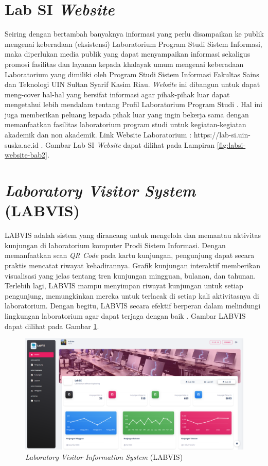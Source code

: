 \section{Lab SI \textit{Website}}
Seiring dengan bertambah banyaknya informasi yang perlu disampaikan ke publik mengenai keberadaan (eksistensi) Laboratorium Program Studi Sistem Informasi, maka diperlukan media publik yang dapat menyampaikan informasi sekaligus promosi fasilitas dan layanan kepada khalayak umum mengenai keberadaan Laboratorium yang dimiliki oleh Program Studi Sistem Informasi Fakultas Sains dan Teknologi UIN Sultan Syarif Kasim Riau. \textit{Website} ini dibangun untuk dapat meng-cover hal-hal yang bersifat informasi agar pihak-pihak luar dapat mengetahui lebih mendalam tentang Profil Laboratorium Program Studi \cite{kusuma2024penerapan}. Hal ini juga memberikan peluang kepada pihak luar yang ingin bekerja sama dengan memanfaatkan fasilitas laboratorium program studi untuk kegiatan-kegiatan akademik dan non akademik.  Link Website Laboratorium : https://lab-si.uin-suska.ac.id \cite{web-prodi}. Gambar Lab SI \textit{Website} dapat dilihat pada Lampiran \ref{fig:labsi-website-bab2}.

\section{\textit{Laboratory Visitor System} (LABVIS)}
LABVIS adalah sistem yang dirancang untuk mengelola dan memantau aktivitas kunjungan di laboratorium komputer Prodi Sistem Informasi. Dengan memanfaatkan scan \textit{QR Code} pada kartu kunjungan, pengunjung dapat secara praktis mencatat riwayat kehadirannya. Grafik kunjungan interaktif memberikan visualisasi yang jelas tentang tren kunjungan mingguan, bulanan, dan tahunan. Terlebih lagi, LABVIS mampu menyimpan riwayat kunjungan untuk setiap pengunjung, memungkinkan mereka untuk terlacak di setiap kali aktivitasnya di laboratorium. Dengan begitu, LABVIS secara efektif berperan dalam melindungi lingkungan laboratorium agar dapat terjaga dengan baik \cite{web-prodi}. Gambar LABVIS dapat dilihat pada Gambar \ref{fig:labvis}.

\begin{figure}[h]
	\centering
	\includegraphics[width=1\linewidth]{konten/gambar/labvis.png}
	\caption{\textit{Laboratory Visitor Information System} (LABVIS)}
	\label{fig:labvis}
\end{figure}

